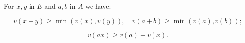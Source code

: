 For $x, y$ in $E$ and $a, b$ in $A$ we have:

$$v(x + y) \geq \min(v(x), v(y)), \quad v(a + b) \geq \min(v(a), v(b));$$

$$v(ax) \geq v(a) + v(x).$$